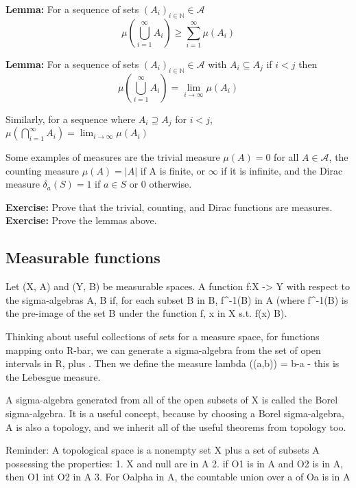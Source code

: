 \documentclass{article}
\begin{document}
\textbf{Lemma:} For a sequence of sets $(A_i)_{i \in \mathbb{N}} \in \mathcal{A}$ 
\[ \mu \left( \bigcup_{i =1}^{\infty} A_i \right) \ge \sum_{i=1}^{\infty} \mu
                \left( A_i \right) \]

\textbf{Lemma:} For a sequence of sets $(A_i)_{i \in \mathbb{N}} \in \mathcal{A}$ with 
$A_i \subseteq A_j$ if $i<j$ then 
\[ \mu \left( \bigcup_{i =1}^{\infty} A_i \right)= \lim_{i \rightarrow \infty} \mu(A_i) \]

Similarly, for a sequence where $A_i \supseteq A_j$ for $i<j$, 
$\mu \left( \bigcap_{i =1}^{\infty} A_i \right)= \lim_{i \rightarrow \infty} \mu(A_i)$

Some examples of measures are the trivial measure $\mu(A)=0$ for all $A \in \mathcal{A}$,
the counting measure $\mu(A) = |A|$ if A is finite, or $\infty$ if it is infinite, and the
Dirac measure $\delta_a(S) = 1$ if $a \in S$ or 0 otherwise.

\textbf{Exercise:} Prove that the trivial, counting, and Dirac functions are measures.
\textbf{Exercise:} Prove the lemmas above.

\subsection{Measurable functions}

Let (X, A) and (Y, B) be measurable spaces. A function f:X -> Y with respect to the 
sigma-algebras A, B if, for each subset B in B, f^-1(B) in A (where f^-1(B) is the
pre-image of the set B under the function f, {x in X s.t. f(x) \in B}).

Thinking about useful collections of sets for a measure space, for functions mapping onto 
R-bar, we can generate a sigma-algebra from the set of open intervals in R, plus \infty.
Then we define the measure lambda ((a,b)) = b-a - this is the Lebesgue measure.

A sigma-algebra generated from all of the open subsets of X is called the Borel
sigma-algebra. It is a useful concept, because by choosing a Borel sigma-algebra, A is
also a topology, and we inherit all of the useful theorems from topology too.

Reminder: A topological space is a nonempty set X plus a set of subsets A possessing the properties:
1. X and null are in A
2. if O1 is in A and O2 is in A, then O1 int O2 in A
3. For Oalpha in A, the countable union over a of Oa is in A
\end{document}
